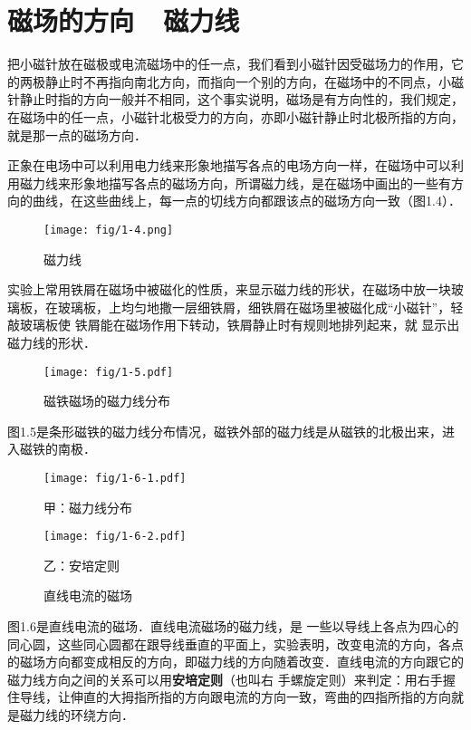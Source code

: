 \section{磁场的方向~~磁力线}
把小磁针放在磁极或电流磁场中的任一点，我们看到小磁针因受磁场力的作用，它的两极静止时不再指向南北方向，而指向一个别的方向，在磁场中的不同点，小磁针静止时指的方向一般并不相同，这个事实说明，磁场是有方向性的，我们规定，在磁场中的任一点，小磁针北极受力的方向，亦即小磁针静止时北极所指的方向，就是那一点的磁场方向．

正象在电场中可以利用电力线来形象地描写各点的电场方向一样，在磁场中可以利用磁力线来形象地描写各点的磁场方向，所谓磁力线，是在磁场中画出的一些有方向的曲线，在这些曲线上，每一点的切线方向都跟该点的磁场方向一致（图1.4）．
\begin{figure}[htp]\centering
\texttt{[image: fig/1-4.png]}
\caption{磁力线}
\end{figure}

实验上常用铁屑在磁场中被磁化的性质，来显示磁力线的形状，在磁场中放一块玻璃板，在玻璃板，上均匀地撒一层细铁屑，细铁屑在磁场里被磁化成“小磁针”，轻敲玻璃板使
铁屑能在磁场作用下转动，铁屑静止时有规则地排列起来，就
显示出磁力线的形状．

\begin{figure}[htp]\centering
\texttt{[image: fig/1-5.pdf]}
\caption{磁铁磁场的磁力线分布}
\end{figure}

图1.5是条形磁铁的磁力线分布情况，磁铁外部的磁力线是从磁铁的北极出来，进入磁铁的南极．

\begin{figure}[htp]
\centering
\begin{minipage}[t]{0.48\textwidth}
\centering
\texttt{[image: fig/1-6-1.pdf]}
\caption*{甲：磁力线分布}
\end{minipage}
\begin{minipage}[t]{0.48\textwidth}
\centering
\texttt{[image: fig/1-6-2.pdf]}
\caption*{乙：安培定则}
\end{minipage}
\caption{直线电流的磁场}
\end{figure}

图1.6是直线电流的磁场．直线电流磁场的磁力线，是
一些以导线上各点为四心的同心圆，这些同心圆都在跟导线垂直的平面上，实验表明，改变电流的方向，各点的磁场方向都变成相反的方向，即磁力线的方向随着改变．直线电流的方向跟它的磁力线方向之间的关系可以用\textbf{安培定则}（也叫右
手螺旋定则）来判定：用右手握住导线，让伸直的大拇指所指的方向跟电流的方向一致，弯曲的四指所指的方向就是磁力线的环绕方向．

